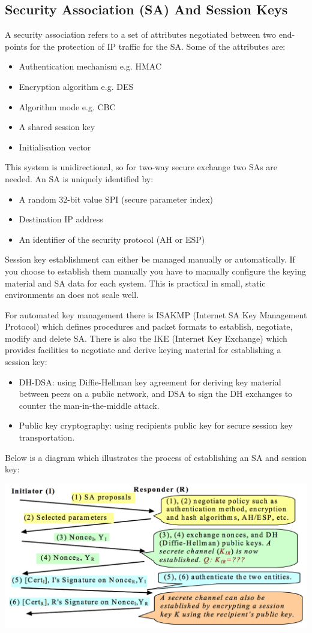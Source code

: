 \documentclass{article}
\begin{document}
\subsection{Security Association (SA) And Session Keys}
A security association refers to a set of attributes negotiated between two end-points for the protection of IP traffic for the SA. Some of the attributes are:
\begin{itemize}
  \item Authentication mechanism e.g. HMAC
  \item Encryption algorithm e.g. DES
  \item Algorithm mode e.g. CBC
  \item A shared session key
  \item Initialisation vector
\end{itemize}
This system is unidirectional, so for two-way secure exchange two SAs are needed. An SA is uniquely identified by:
\begin{itemize}
  \item A random 32-bit value SPI (secure parameter index)
  \item Destination IP address
  \item An identifier of the security protocol (AH or ESP)
\end{itemize}
Session key establishment can either be managed manually or automatically. If you choose to establish them manually you have to manually configure the keying material and SA data for each system. This is practical in small, static environments an does not scale well.

For automated key management there is ISAKMP (Internet SA Key Management Protocol) which defines procedures and packet formats to establish, negotiate, modify and delete SA. There is also the IKE (Internet Key Exchange) which provides facilities to negotiate and derive keying material for establishing a session key:
\begin{itemize}
  \item DH-DSA: using Diffie-Hellman key agreement for deriving key material between peers on a public network, and DSA to sign the DH exchanges to counter the man-in-the-middle attack.
  \item Public key cryptography: using recipients public key for secure session key transportation.
\end{itemize}
Below is a diagram which illustrates the process of establishing an SA and session key:
\begin{center}
  \includegraphics[scale=0.6]{sa-sk-establishment.png}
\end{center}
\end{document}
